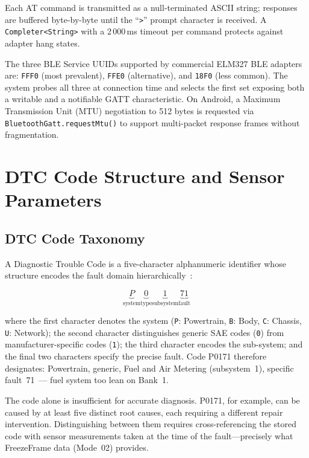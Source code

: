 Each AT command is transmitted as a null-terminated ASCII string; responses are buffered byte-by-byte until the ``\texttt{>}'' prompt character is received.
A \texttt{Completer<String>} with a 2\,000\,ms timeout per command protects against adapter hang states.

The three BLE Service UUIDs supported by commercial ELM327 BLE adapters are: \texttt{FFF0} (most prevalent), \texttt{FFE0} (alternative), and \texttt{18F0} (less common).
The system probes all three at connection time and selects the first set exposing both a writable and a notifiable GATT characteristic.
On Android, a Maximum Transmission Unit (MTU) negotiation to 512 bytes is requested via \texttt{BluetoothGatt.requestMtu()} to support multi-packet response frames without fragmentation.


\section{DTC Code Structure and Sensor Parameters}
\label{sec:dtc}

\subsection{DTC Code Taxonomy}

A Diagnostic Trouble Code is a five-character alphanumeric identifier whose structure encodes the fault domain hierarchically~\cite{sae2020}:

\begin{equation}
\label{eq:dtc}
\underbrace{P}_{\text{system}}
\underbrace{0}_{\text{type}}
\underbrace{1}_{\text{subsystem}}
\underbrace{71}_{\text{fault}}
\end{equation}

\noindent
where the first character denotes the system (\texttt{P}: Powertrain, \texttt{B}: Body, \texttt{C}: Chassis, \texttt{U}: Network); the second character distinguishes generic SAE codes (\texttt{0}) from manufacturer-specific codes (\texttt{1}); the third character encodes the sub-system; and the final two characters specify the precise fault.
Code P0171 therefore designates: Powertrain, generic, Fuel and Air Metering (subsystem~1), specific fault~71~--- fuel system too lean on Bank~1.

The code alone is insufficient for accurate diagnosis.
P0171, for example, can be caused by at least five distinct root causes, each requiring a different repair intervention.
Distinguishing between them requires cross-referencing the stored code with sensor measurements taken at the time of the fault---precisely what FreezeFrame data (Mode~02) provides.

